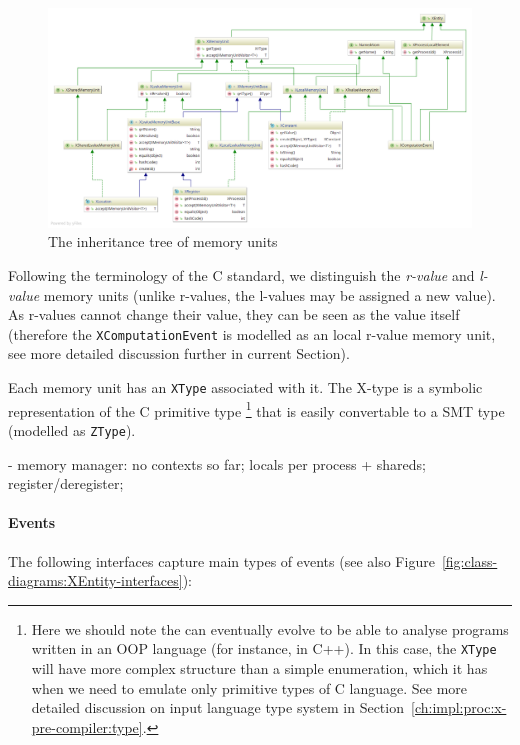 \begin{figure}[t]%
  \centering
  \includegraphics[width=\textwidth,height=\textheight,keepaspectratio]{img/my/class-diagrams/XMemoryUnit-m.png}
  \caption{The inheritance tree of \xgraph{} memory units}
  \label{fig:class-diagrams:XMemoryUnit}
\end{figure}

Following the terminology of the C standard, we distinguish the \textit{r-value} and \textit{l-value} memory units (unlike r-values, the l-values may be assigned a new value).
As r-values cannot change their value, they can be seen as the value itself (therefore the \texttt{XComputationEvent} is modelled as an local r-value memory unit, see more detailed discussion further in current Section).

Each memory unit has an \texttt{XType} associated with it.
The X-type is a symbolic representation of the C primitive type%
\footnote{Here we should note the \porthos[2] can eventually evolve to be able to analyse programs written in an OOP language (for instance, in C++). In this case, the \texttt{XType} will have more complex structure than a simple enumeration, which it has when we need to emulate only primitive types of C language. See more detailed discussion on input language type system in Section~\ref{ch:impl:proc:x-pre-compiler:type}.} %
that is easily convertable to a SMT type (modelled as \texttt{ZType}).%

- memory manager: no contexts so far; locals per process + shareds; register/deregister;


\paragraph{Events}
\label{ch:impl:model:xgraph:evt}

The following interfaces capture main types of events (see also Figure~\ref{fig:class-diagrams:XEntity-interfaces}):

